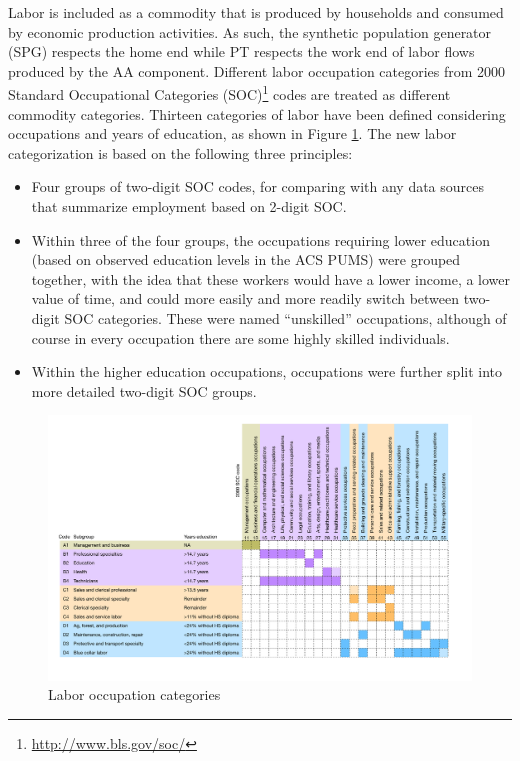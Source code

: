 Labor is included as a commodity that is produced by households and consumed by economic production activities. As such, the synthetic population generator (SPG) respects the home end while PT respects the work end of labor flows produced by the AA component. Different labor occupation categories from 2000 Standard Occupational Categories (SOC)\footnote{\url{http://www.bls.gov/soc/}} codes are treated as different commodity categories. Thirteen categories of labor have been defined considering occupations and years of education, as shown in Figure \ref{fig:labor-occupation-categories}. The new labor categorization is based on the following three principles:
\begin{itemize}
\item Four groups of two-digit SOC codes, for comparing with any data sources that summarize employment based on 2-digit SOC.
\item Within three of the four groups, the occupations requiring lower education (based on observed education levels in the ACS PUMS) were grouped together, with the idea that these workers would have a lower income, a lower value of time, and could more easily and more readily switch between two-digit SOC categories. These were named ``unskilled'' occupations, although of course in every occupation there are some highly skilled individuals.
\item Within the higher education occupations, occupations were further split into more detailed two-digit SOC groups.
\end{itemize}

\begin{figure}[!t]   %
\centering
\includegraphics[scale=0.4, trim=11mm 23mm 0mm 0mm, clip]{overview/commodities-labor-categories}  %
\caption{Labor occupation categories}\label{fig:labor-occupation-categories}
\end{figure}

